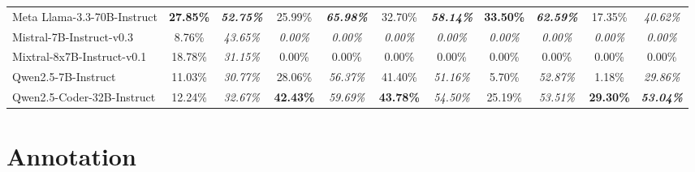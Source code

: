 \documentclass[conference]{IEEEtran}
\begin{document}
\begin{table}[t]
\begin{tabular}{l *{5}{cc}}
Meta Llama-3.3-70B-Instruct     & \textbf{27.85\%} & \textbf{\textit{52.75\%}} & 25.99\%  & \textbf{\textit{65.98\%}} & 32.70\%  & \textbf{\textit{58.14\%}} & \textbf{33.50\%} & \textbf{\textit{62.59\%}} & 17.35\%  & \textit{40.62\%}   \\
Mistral-7B-Instruct-v0.3        & 8.76\%   & \textit{43.65\%}    & \textit{0.00\%} & \textit{0.00\%}    & \textit{0.00\%} & \textit{0.00\%}    & \textit{0.00\%} & \textit{0.00\%}    & \textit{0.00\%} & \textit{0.00\%}  \\
Mixtral-8x7B-Instruct-v0.1      & 18.78\%  & \textit{31.15\%}    & 0.00\%  & 0.00\%    & 0.00\%  & 0.00\%    & 0.00\%  & 0.00\%     & 0.00\%  & 0.00\%  \\
Qwen2.5-7B-Instruct             & 11.03\%  & \textit{30.77\%}    & 28.06\%  & \textit{56.37\%}    & 41.40\%  & \textit{51.16\%}    & 5.70\%   & \textit{52.87\%}    & 1.18\%   & \textit{29.86\%}   \\
Qwen2.5-Coder-32B-Instruct      & 12.24\%  & \textit{32.67\%}    & \textbf{42.43\%} & \textit{59.69\%}    & \textbf{43.78\%} & \textit{54.50\%}    & 25.19\%  & \textit{53.51\%}    & \textbf{29.30\%} & \textbf{\textit{53.04\%}} \\
    \bottomrule
  \end{tabular}
\end{table}



\section{Annotation}
\end{document}
